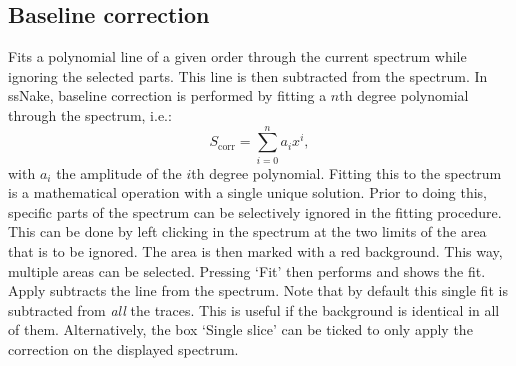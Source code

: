\documentclass[11pt,a4paper]{article}
\begin{document}
\subsection{Baseline correction}
Fits a polynomial line of a given order through the current spectrum while ignoring the selected parts. This line is then subtracted from the spectrum.
In ssNake, baseline correction is performed by fitting a $n$th degree polynomial through the spectrum, i.e.:
\begin{equation*}
S_\text{corr} = \sum_{i=0}^n a_i x^i ,
\end{equation*}
with $a_i$ the amplitude of the $i$th degree polynomial. Fitting this to the spectrum is a mathematical operation with a single unique solution. Prior to doing this, specific parts of the spectrum can be selectively ignored in the fitting procedure. This can be done by left clicking in the spectrum at the two limits of the area that is to be ignored. The area is then marked with a red background. This way, multiple areas can be selected. Pressing  `Fit' then performs and shows the fit. Apply subtracts the line from the spectrum. Note that by default this single fit is subtracted from \textit{all} the traces. This is useful if the background is identical in all of them. Alternatively, the box `Single slice' can be ticked to only apply the correction on the displayed spectrum.



\end{document}
